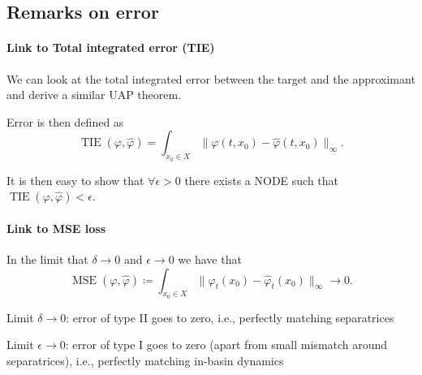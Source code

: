 \documentclass{article}
\theoremstyle{definition} \newtheorem{definition}{Definition}
\theoremstyle{remark} \newtheorem{remark}{Remark}
\newcounter{ct}
\begin{document}
\subsection{Remarks on error}\label{sec:error_remarks}
\paragraph{Link to Total integrated error (TIE)}
We can look at the total integrated error between the target and the approximant and derive a similar UAP theorem.

Error is then defined as 
\begin{equation}
\operatorname{TIE}(\varphi, \hat{\varphi}) = \int_{x_0\in X}\|\varphi(t,x_0) - \hat{\varphi}(t, x_0)\|_\infty.
\end{equation}

It is then easy to show that $\forall\epsilon>0$ there exists a NODE such that $\operatorname{TIE}(\varphi, \hat{\varphi})<\epsilon$.

\paragraph{Link to MSE loss}
In the limit that $\delta\rightarrow 0$ and $\epsilon\rightarrow 0$  we have that 
\[\operatorname{MSE}(\varphi, \hat{\varphi}) \coloneqq \int_{x_0\in X} \|\varphi_t(x_0) - \hat{\varphi}_t(x_0)\|_\infty \rightarrow 0.\]


Limit $\delta\rightarrow 0$: error of type II goes to zero, i.e., perfectly matching separatrices


Limit $\epsilon\rightarrow 0$: error of type I goes to zero (apart from small mismatch around separatrices), i.e., perfectly matching in-basin dynamics
\end{document}
